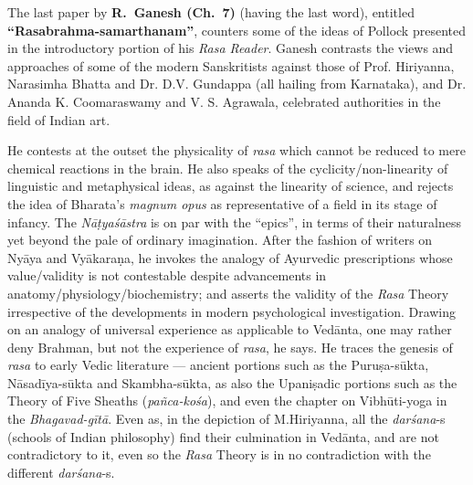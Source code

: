 The last paper by {\bf R.~Ganesh (Ch.~7)} (having the last word), entitled {\bf “Rasabrahma-samarthanam”}, counters some of the ideas of Pollock presented in the introductory portion of his \textsl{Rasa Reader}. Ganesh contrasts the views and approaches of some of the modern Sanskritists against those of Prof. Hiriyanna, Narasimha Bhatta and Dr. D.V. Gundappa (all hailing from Karnataka), and Dr. Ananda K. Coomaraswamy and V. S. Agrawala, celebrated authorities in the field of Indian art.

He contests at the outset the physicality of \textsl{rasa} which cannot be reduced to mere chemical reactions in the brain. He also speaks of the cyclicity/non-linearity of linguistic and metaphysical ideas, as against the linearity of science, and rejects the idea of Bharata’s \textsl{magnum opus} as representative of a field in its stage of infancy. The \textsl{Nāṭyaśāstra} is on par with the “epics”, in terms of their naturalness yet beyond the pale of ordinary imagination. After the fashion of writers on Nyāya and Vyākaraṇa, he invokes the analogy of Ayurvedic prescriptions whose value/validity is not contestable despite advancements in anatomy/physiology/biochemistry; and asserts the validity of the \textsl{Rasa} Theory irrespective of the developments in modern psychological investigation. Drawing on an analogy of universal experience as applicable to Vedānta, one may rather deny Brahman, but not the experience of \textsl{rasa}, he says. He traces the genesis of \textsl{rasa} to early Vedic literature --- ancient portions such as the Puruṣa-sūkta, Nāsadīya-sūkta and Skambha-sūkta, as also the Upaniṣadic portions such as the Theory of Five Sheaths (\textsl{pañca-kośa}), and even the chapter on Vibhūti-yoga in the \textsl{Bhagavad-gītā}. Even as, in the depiction of M.\@ Hiriyanna, all the \textsl{darśana}-s (schools of Indian philosophy) find their culmination in Vedānta, and are not contradictory to it, even so the \textsl{Rasa} Theory is in no contradiction with the different \textsl{darśana}-s.

